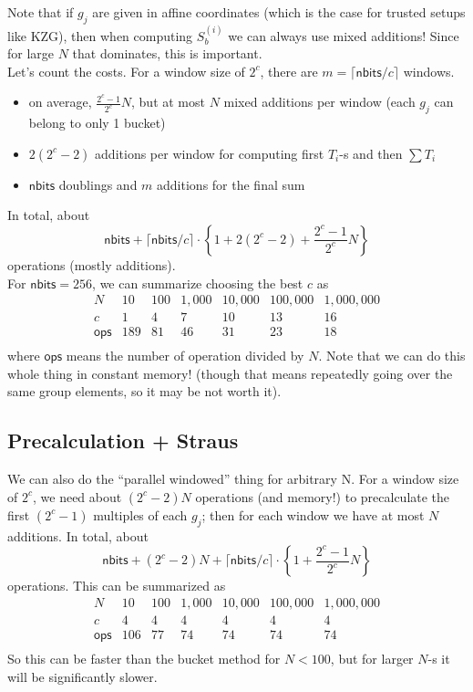 \documentclass[12pt,draft,a4paper,openany,oneside]{amsbook}
\def\nbits{\mathsf{nbits}}
\theoremstyle{plain}
\theoremstyle{definition}
\begin{document}
Note that if $g_j$ are given in affine coordinates (which is the case for
trusted setups like KZG), then when computing $S_b^{(i)}$ we can always use
mixed additions! Since for large $N$ that dominates, this is important.\\

Let's count the costs. For a window size of $2^c$, there are $m=\lceil\nbits/c\rceil$
windows. 
\begin{itemize}
\item on average, $\frac{2^c-1}{2^c}N$, but at most $N$ mixed additions per window 
      (each $g_j$ can belong to only 1 bucket)
\item $2(2^c-2)$ additions per window for computing first $T_i$-s and then $\sum T_i$
\item $\nbits$ doublings and $m$ additions for the final sum
\end{itemize}
In total, about
\[ \nbits + \lceil\nbits/c\rceil\cdot\left\{1 + 2(2^c-2) + \frac{2^c-1}{2^c}N \right\} \]
operations (mostly additions).\\

For $\nbits =256$, we can summarize choosing the best $c$ as 
\[
\begin{array}{c||c|c|c|c|c|c}
N            & 10  & 100 & 1,000 & 10,000 & 100,000 & 1,000,000 \\ \hline
c            & 1   & 4   &  7    & 10     &  13     &  16       \\
\textsf{ops} & 189 & 81  &  46   & 31     &  23     &  18       \\
\end{array}
\]
where $\textsf{ops}$ means the number of operation divided by $N$. 
Note that we can do this whole thing in constant memory! (though that
means repeatedly going over the same group elements, so it may be not worth
it). \\

\subsection{Precalculation + Straus}
We can also do the ``parallel windowed'' thing for arbitrary N.
For a window size of $2^c$, we need about $(2^c-2)N$ operations (and memory!) to
precalculate the first $(2^c-1)$ multiples of each $g_j$; then for each
window we have at most $N$ additions.
In total, about
\[ \nbits + (2^c-2)N + \lceil\nbits/c\rceil\cdot\left\{1 + \frac{2^c-1}{2^c}N \right\} \]
operations. This can be summarized as
\[
\begin{array}{c||c|c|c|c|c|c}
N            & 10  & 100 & 1,000 & 10,000 & 100,000 & 1,000,000 \\ \hline
c            & 4   & 4   &  4   &  4    &  4     &    4     \\
\textsf{ops} & 106 & 77  &  74  &  74   &  74    &    74    \\
\end{array}
\]
So this can be faster than the bucket method for $N<100$, but for larger $N$-s
it will be significantly slower.
\end{document}
